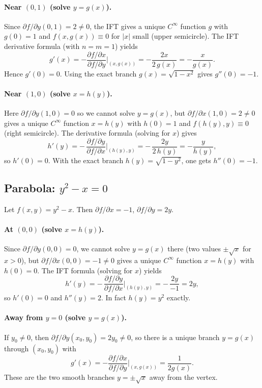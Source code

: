 \documentclass[12pt,a4paper]{article}
\theoremstyle{plain}
\theoremstyle{definition}
\theoremstyle{remark}
\theoremstyle{remark}
\begin{document}
	\paragraph{Near $(0,1)$ (solve $y=g(x)$).}
	Since $\partial f/\partial y(0,1)=2\neq 0$, the IFT gives a unique $C^\infty$ function
	$g$ with $g(0)=1$ and $f(x,g(x))\equiv 0$ for $|x|$ small (upper semicircle).
	The IFT derivative formula (with $n=m=1$) yields
	\[
	g'(x)= -\frac{\partial f/\partial x}{\partial f/\partial y}\Big|_{(x,g(x))}
	= -\frac{2x}{2\,g(x)} = -\frac{x}{g(x)}.
	\]
	Hence $g'(0)=0$. Using the exact branch $g(x)=\sqrt{1-x^2}$ gives
	$g''(0)=-1$.
	
	\paragraph{Near $(1,0)$ (solve $x=h(y)$).}
	Here $\partial f/\partial y(1,0)=0$ so we cannot solve $y=g(x)$,
	but $\partial f/\partial x(1,0)=2\neq0$ gives a unique $C^\infty$ function $x=h(y)$ with
	$h(0)=1$ and $f(h(y),y)\equiv 0$ (right semicircle).
	The derivative formula (solving for $x$) gives
	\[
	h'(y) = -\,\frac{\partial f/\partial y}{\partial f/\partial x}\Big|_{(h(y),y)}
	= -\,\frac{2y}{2\,h(y)} = -\frac{y}{h(y)},
	\]
	so $h'(0)=0$. With the exact branch $h(y)=\sqrt{1-y^2}$, one gets $h''(0)=-1$.
	
	\subsection*{Parabola: $y^2-x=0$}
	Let $f(x,y)=y^2-x$. Then $\partial f/\partial x=-1$, $\partial f/\partial y=2y$.
	
	\paragraph{At $(0,0)$ (solve $x=h(y)$).}
	Since $\partial f/\partial y(0,0)=0$, we cannot solve $y=g(x)$ there (two values $\pm\sqrt{x}$ for $x>0$),
	but $\partial f/\partial x(0,0)=-1\neq0$ gives a unique $C^\infty$ function $x=h(y)$ with $h(0)=0$.
	The IFT formula (solving for $x$) yields
	\[
	h'(y) = -\,\frac{\partial f/\partial y}{\partial f/\partial x}\Big|_{(h(y),y)}
	= -\,\frac{2y}{-1} = 2y,
	\]
	so $h'(0)=0$ and $h''(y)=2$. In fact $h(y)=y^2$ exactly.
	
	\paragraph{Away from $y=0$ (solve $y=g(x)$).}
	If $y_0\neq 0$, then $\partial f/\partial y(x_0,y_0)=2y_0\neq 0$, so there is a unique branch
	$y=g(x)$ through $(x_0,y_0)$ with
	\[
	g'(x)= -\frac{\partial f/\partial x}{\partial f/\partial y}\Big|_{(x,g(x))}
	= \frac{1}{2g(x)}.
	\]
	These are the two smooth branches $y=\pm\sqrt{x}$ away from the vertex.
	
\end{document}
